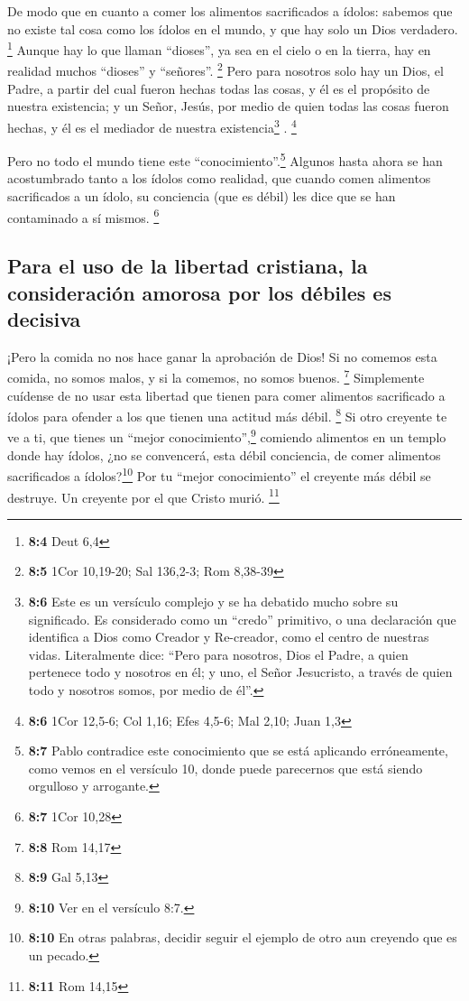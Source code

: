  De modo que en cuanto a comer los alimentos sacrificados
a ídolos: sabemos que no existe tal cosa como los ídolos en el mundo, y
que hay solo un Dios verdadero. \footnote{\textbf{8:4} Deut 6,4}
 Aunque hay lo que llaman ``dioses'', ya sea en el cielo o
en la tierra, hay en realidad muchos ``dioses'' y ``señores''.
\footnote{\textbf{8:5} 1Cor 10,19-20; Sal 136,2-3; Rom 8,38-39}
 Pero para nosotros solo hay un Dios, el Padre, a partir
del cual fueron hechas todas las cosas, y él es el propósito de nuestra
existencia; y un Señor, Jesús, por medio de quien todas las cosas fueron
hechas, y él es el mediador de nuestra existencia\footnote{\textbf{8:6}
  Este es un versículo complejo y se ha debatido mucho sobre su
  significado. Es considerado como un ``credo'' primitivo, o una
  declaración que identifica a Dios como Creador y Re-creador, como el
  centro de nuestras vidas. Literalmente dice: ``Pero para nosotros,
  Dios el Padre, a quien pertenece todo y nosotros en él; y uno, el
  Señor Jesucristo, a través de quien todo y nosotros somos, por medio
  de él''.} . \footnote{\textbf{8:6} 1Cor 12,5-6; Col 1,16; Efes 4,5-6;
  Mal 2,10; Juan 1,3}

 Pero no todo el mundo tiene este
``conocimiento''.\footnote{\textbf{8:7} Pablo contradice este
  conocimiento que se está aplicando erróneamente, como vemos en el
  versículo 10, donde puede parecernos que está siendo orgulloso y
  arrogante.} Algunos hasta ahora se han acostumbrado tanto a los ídolos
como realidad, que cuando comen alimentos sacrificados a un ídolo, su
conciencia (que es débil) les dice que se han contaminado a sí mismos.
\footnote{\textbf{8:7} 1Cor 10,28}

\hypertarget{para-el-uso-de-la-libertad-cristiana-la-consideraciuxf3n-amorosa-por-los-duxe9biles-es-decisiva}{%
\subsection{Para el uso de la libertad cristiana, la consideración
amorosa por los débiles es
decisiva}\label{para-el-uso-de-la-libertad-cristiana-la-consideraciuxf3n-amorosa-por-los-duxe9biles-es-decisiva}}

 ¡Pero la comida no nos hace ganar la aprobación de Dios!
Si no comemos esta comida, no somos malos, y si la comemos, no somos
buenos. \footnote{\textbf{8:8} Rom 14,17}  Simplemente
cuídense de no usar esta libertad que tienen para comer alimentos
sacrificado a ídolos para ofender a los que tienen una actitud más
débil. \footnote{\textbf{8:9} Gal 5,13}  Si otro creyente
te ve a ti, que tienes un ``mejor conocimiento'',\footnote{\textbf{8:10}
  Ver en el versículo 8:7.} comiendo alimentos en un templo donde hay
ídolos, ¿no se convencerá, esta débil conciencia, de comer alimentos
sacrificados a ídolos?\footnote{\textbf{8:10} En otras palabras, decidir
  seguir el ejemplo de otro aun creyendo que es un pecado.}
 Por tu ``mejor conocimiento'' el creyente más débil se
destruye. Un creyente por el que Cristo murió. \footnote{\textbf{8:11}
  Rom 14,15}

